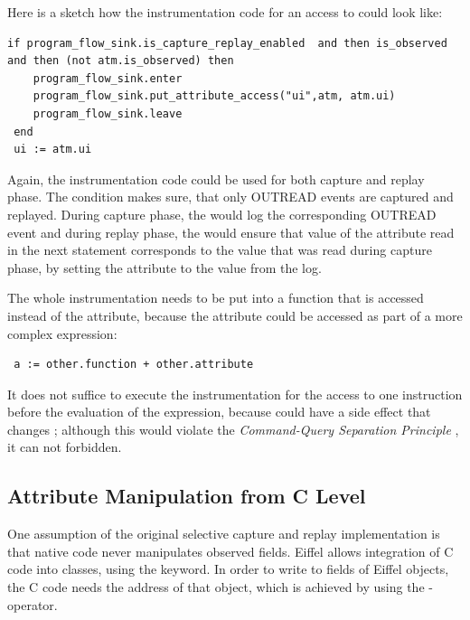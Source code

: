 Here is a sketch how the instrumentation code for an access to  could look like:
\begin{lstlisting}[caption=Instrumentation of an Attribute Access]
 if program_flow_sink.is_capture_replay_enabled  and then is_observed and then (not atm.is_observed) then
	program_flow_sink.enter
	program_flow_sink.put_attribute_access("ui",atm, atm.ui)
	program_flow_sink.leave
 end
 ui := atm.ui
\end{lstlisting}
Again, the instrumentation code could be used for both capture and replay phase. The condition makes sure, that only OUTREAD events are captured and replayed. During capture phase, the  would log the corresponding OUTREAD event and during replay phase, the  would ensure that value of the attribute read in the next statement corresponds to the value that was read during capture phase, by setting the attribute to the value from the log.

The whole instrumentation needs to be put into a function that is accessed instead of the attribute, because the attribute could be accessed as part of a more complex expression:
\begin{lstlisting}
 a := other.function + other.attribute
\end{lstlisting}
It does not suffice to execute the instrumentation for the access to  one instruction before the evaluation of the expression, because  could have a side effect that changes ; although this would violate the \emph{Command-Query Separation Principle} \cite{oosc2}, it can not forbidden.


\subsection{Attribute Manipulation from C Level}
One assumption of the original selective capture and replay implementation is that native code never manipulates observed fields. Eiffel allows integration of C code into classes, using the  keyword. In order to write to fields of Eiffel objects, the C code needs the address of that object, which is achieved by using the \identifier{\$} - operator.

